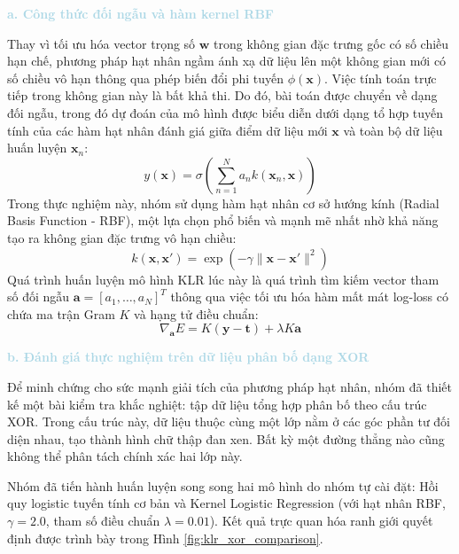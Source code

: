 \vspace{0.5em}
\noindent\textcolor{lightblue}{\textbf{a. Công thức đối ngẫu và hàm kernel RBF}}
\vspace{0.5em}

Thay vì tối ưu hóa vector trọng số $\mathbf{w}$ trong không gian đặc trưng gốc có số chiều hạn chế, phương pháp hạt nhân ngầm ánh xạ dữ liệu lên một không gian mới có số chiều vô hạn thông qua phép biến đổi phi tuyến $\phi(\mathbf{x})$. Việc tính toán trực tiếp trong không gian này là bất khả thi. Do đó, bài toán được chuyển về dạng đối ngẫu, trong đó dự đoán của mô hình được biểu diễn dưới dạng tổ hợp tuyến tính của các hàm hạt nhân đánh giá giữa điểm dữ liệu mới $\mathbf{x}$ và toàn bộ dữ liệu huấn luyện $\mathbf{x}_n$:
\begin{equation}
    y(\mathbf{x}) = \sigma \left( \sum_{n=1}^{N} a_n k(\mathbf{x}_n, \mathbf{x}) \right)
\end{equation}
Trong thực nghiệm này, nhóm sử dụng hàm hạt nhân cơ sở hướng kính (Radial Basis Function - RBF), một lựa chọn phổ biến và mạnh mẽ nhất nhờ khả năng tạo ra không gian đặc trưng vô hạn chiều:
\begin{equation}
    k(\mathbf{x}, \mathbf{x}') = \exp(-\gamma \|\mathbf{x} - \mathbf{x}'\|^2)
\end{equation}
Quá trình huấn luyện mô hình KLR lúc này là quá trình tìm kiếm vector tham số đối ngẫu $\mathbf{a} = [a_1, \dots, a_N]^T$ thông qua việc tối ưu hóa hàm mất mát log-loss có chứa ma trận Gram $K$ và hạng tử điều chuẩn:
\begin{equation}
    \nabla_{\mathbf{a}} E = K(\mathbf{y} - \mathbf{t}) + \lambda K \mathbf{a}
\end{equation}

\vspace{0.5em}
\noindent\textcolor{lightblue}{\textbf{b. Đánh giá thực nghiệm trên dữ liệu phân bố dạng XOR}}
\vspace{0.5em}

Để minh chứng cho sức mạnh giải tích của phương pháp hạt nhân, nhóm đã thiết kế một bài kiểm tra khắc nghiệt: tập dữ liệu tổng hợp phân bố theo cấu trúc XOR. Trong cấu trúc này, dữ liệu thuộc cùng một lớp nằm ở các góc phần tư đối diện nhau, tạo thành hình chữ thập đan xen. Bất kỳ một đường thẳng nào cũng không thể phân tách chính xác hai lớp này.

Nhóm đã tiến hành huấn luyện song song hai mô hình do nhóm tự cài đặt: Hồi quy logistic tuyến tính cơ bản và Kernel Logistic Regression (với hạt nhân RBF, $\gamma = 2.0$, tham số điều chuẩn $\lambda = 0.01$). Kết quả trực quan hóa ranh giới quyết định được trình bày trong Hình \ref{fig:klr_xor_comparison}.

